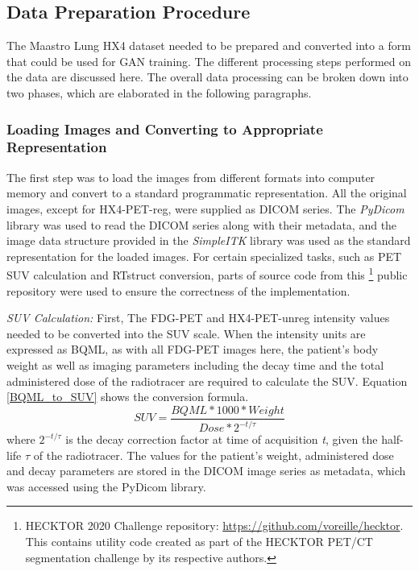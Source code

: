 \subsection{Data Preparation Procedure}
\label{Data_Processing}
The Maastro Lung HX4 dataset needed to be prepared and converted into a form that could be used for GAN training. The different processing steps performed on the data are discussed here. The overall data processing can be broken down into two phases, which are elaborated in the following paragraphs. 


\subsubsection{Loading Images and Converting to Appropriate Representation}
The first step was to load the images from different formats into computer memory and convert to a standard programmatic representation. All the original images, except for HX4-PET-reg, were supplied as DICOM series. The \textit{PyDicom} library was used to read the DICOM series along with their metadata, and the image data structure provided in the \textit{SimpleITK} library was used as the standard representation for the loaded images. For certain specialized tasks, such as PET SUV calculation and RTstruct conversion, parts of source code from this \footnote{HECKTOR 2020 Challenge repository: \url{https://github.com/voreille/hecktor}. This contains utility code created as part of the HECKTOR PET/CT segmentation challenge \cite{andrearczyk2020overview} by its respective authors.} public repository were used to ensure the correctness of the implementation. 

\vspace{4mm}
\noindent
\textit{SUV Calculation:} First, The FDG-PET and HX4-PET-unreg intensity values needed to be converted into the SUV scale. When the intensity units are expressed as BQML, as with all FDG-PET images here, the patient's body weight as well as imaging parameters including the decay time and the total administered dose of the radiotracer are required to calculate the SUV. Equation \ref{BQML_to_SUV} shows the conversion formula. 
\begin{equation}
    SUV = \frac{BQML * 1000 * Weight}{Dose * 2^{-t/\tau}} 
    \label{BQML_to_SUV}
\end{equation}
where $2^{-t/\tau}$ is the decay correction factor at time of acquisition \textit{t}, given the half-life $\tau$ of the radiotracer. The values for the patient's weight, administered dose and decay parameters are stored in the DICOM image series as metadata, which was accessed using the PyDicom library. 

